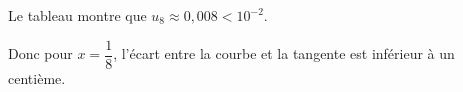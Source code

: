 \begin{enumerate}[resume]
%
Le tableau montre que $u_8 \approx 0,008 < 10^{-2}$.

Donc pour $x = \dfrac{1}{8}$, l'écart entre la courbe et la tangente est inférieur à un centième.

\end{enumerate}

\bigskip

